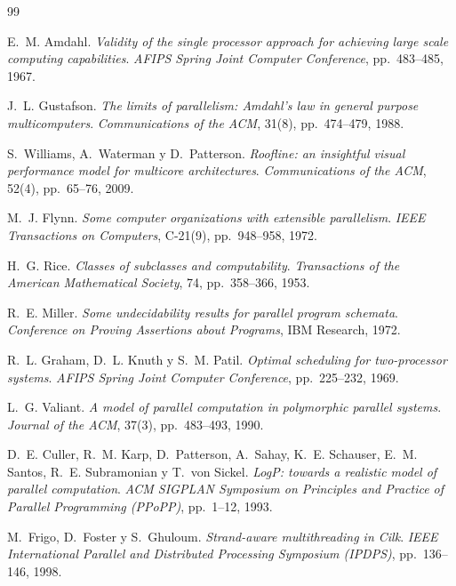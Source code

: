 \documentclass[a4paper,11pt]{article}
\begin{document}
\begin{thebibliography}{99}

E.~M. Amdahl.
\newblock \emph{Validity of the single processor approach for achieving large scale computing capabilities}.
\newblock \emph{AFIPS Spring Joint Computer Conference}, pp.~483--485, 1967.

J.~L. Gustafson.
\newblock \emph{The limits of parallelism: Amdahl's law in general purpose multicomputers}.
\newblock \emph{Communications of the ACM}, 31(8), pp.~474--479, 1988.

S.~Williams, A.~Waterman y D.~Patterson.
\newblock \emph{Roofline: an insightful visual performance model for multicore architectures}.
\newblock \emph{Communications of the ACM}, 52(4), pp.~65--76, 2009.

M.~J. Flynn.
\newblock \emph{Some computer organizations with extensible parallelism}.
\newblock \emph{IEEE Transactions on Computers}, C-21(9), pp.~948--958, 1972.

H.~G. Rice.
\newblock \emph{Classes of subclasses and computability}.
\newblock \emph{Transactions of the American Mathematical Society}, 74, pp.~358--366, 1953.

R.~E. Miller.
\newblock \emph{Some undecidability results for parallel program schemata}.
\newblock \emph{Conference on Proving Assertions about Programs}, IBM Research, 1972.

R.~L. Graham, D.~L. Knuth y S.~M. Patil.
\newblock \emph{Optimal scheduling for two-processor systems}.
\newblock \emph{AFIPS Spring Joint Computer Conference}, pp.~225--232, 1969.

L.~G. Valiant.
\newblock \emph{A model of parallel computation in polymorphic parallel systems}.
\newblock \emph{Journal of the ACM}, 37(3), pp.~483--493, 1990.

D.~E. Culler, R.~M. Karp, D.~Patterson, A.~Sahay, K.~E. Schauser, E.~M. Santos,
R.~E. Subramonian y T.~von Sickel.
\newblock \emph{LogP: towards a realistic model of parallel computation}.
\newblock \emph{ACM SIGPLAN Symposium on Principles and Practice of Parallel Programming (PPoPP)}, pp.~1--12, 1993.

M.~Frigo, D.~Foster y S.~Ghuloum.
\newblock \emph{Strand-aware multithreading in Cilk}.
\newblock \emph{IEEE International Parallel and Distributed Processing Symposium (IPDPS)}, pp.~136--146, 1998.


\end{thebibliography}
\end{document}
